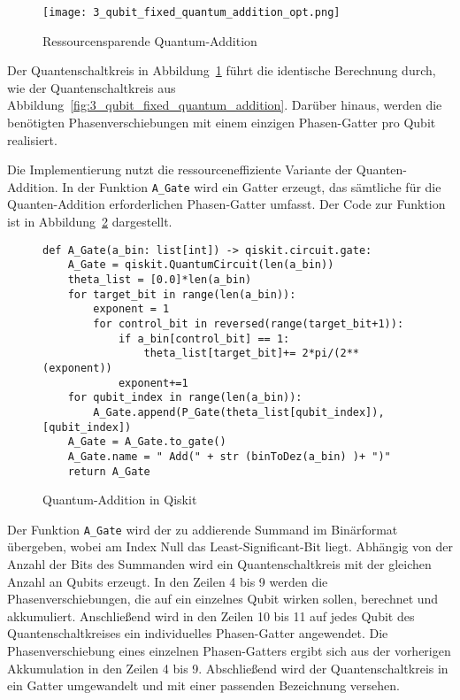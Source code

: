 \begin{figure}[H]
  \caption{Ressourcensparende Quantum-Addition}
  \label{fig:3_qubit_fixed_quantum_addition_opt}
  \texttt{[image: 3\_qubit\_fixed\_quantum\_addition\_opt.png]}
  \centering
  \end{figure}
Der Quantenschaltkreis in Abbildung~\ref{fig:3_qubit_fixed_quantum_addition_opt} führt die identische 
Berechnung durch, wie der Quantenschaltkreis aus Abbildung~\ref{fig:3_qubit_fixed_quantum_addition}.
Darüber hinaus, werden die benötigten Phasenverschiebungen mit einem einzigen Phasen-Gatter pro Qubit realisiert.

Die Implementierung nutzt die ressourceneffiziente Variante der Quanten-Addition.
In der Funktion \texttt{A\_Gate} wird ein Gatter erzeugt, 
das sämtliche für die Quanten-Addition erforderlichen Phasen-Gatter umfasst.
Der Code zur Funktion ist in Abbildung~\ref{code:QuantumAdd} dargestellt.
\begin{figure}[H]
  \caption{Quantum-Addition in Qiskit}
  \label{code:QuantumAdd}
\begin{verbatim}    
def A_Gate(a_bin: list[int]) -> qiskit.circuit.gate:
    A_Gate = qiskit.QuantumCircuit(len(a_bin))
    theta_list = [0.0]*len(a_bin)
    for target_bit in range(len(a_bin)):
        exponent = 1
        for control_bit in reversed(range(target_bit+1)):
            if a_bin[control_bit] == 1:
                theta_list[target_bit]+= 2*pi/(2**(exponent))
            exponent+=1
    for qubit_index in range(len(a_bin)):
        A_Gate.append(P_Gate(theta_list[qubit_index]),[qubit_index])
    A_Gate = A_Gate.to_gate()
    A_Gate.name = " Add(" + str (binToDez(a_bin) )+ ")"
    return A_Gate 
  \end{verbatim}
\end{figure}
Der Funktion \texttt{A\_Gate} wird der zu addierende Summand im Binärformat übergeben, 
wobei am Index Null das Least-Significant-Bit liegt.
Abhängig von der Anzahl der Bits des Summanden wird ein Quantenschaltkreis mit der gleichen Anzahl an Qubits erzeugt. 
In den Zeilen 4 bis 9 werden die Phasenverschiebungen, die auf ein einzelnes Qubit wirken sollen, berechnet und akkumuliert.
Anschließend wird in den Zeilen 10 bis 11 auf jedes Qubit des Quantenschaltkreises ein individuelles Phasen-Gatter angewendet.
Die Phasenverschiebung eines einzelnen Phasen-Gatters ergibt sich aus der vorherigen Akkumulation in den Zeilen 4 bis 9.
Abschließend wird der Quantenschaltkreis in ein Gatter umgewandelt und mit einer passenden Bezeichnung versehen.

